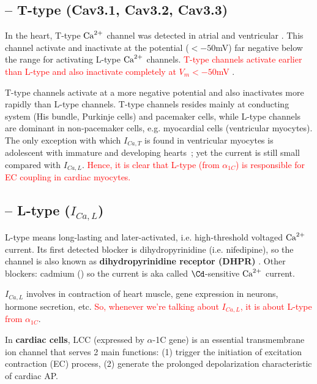 \subsection{-- T-type (Cav3.1, Cav3.2, Cav3.3)}
\label{sec:T-type_Ca-channels}

In the heart, T-type ${\text{Ca}^{2+}}$ channel was detected in atrial \citep{bean1985} and
ventricular \citep{nilius1985}. This channel activate and inactivate at the potential
($<-50$mV) far negative below the range for activating L-type ${\text{Ca}^{2+}}$ channels. 
\textcolor{red}{T-type channels activate earlier than L-type and also
inactivate completely at $V_m < -50$mV} \citep{hess1984}. 

\begin{framed}
  T-type channels activate at a more negative potential and also
  inactivates more rapidly than L-type channels. T-type channels resides
  mainly at conducting system (His bundle, Purkinje cells) and pacemaker
  cells, while L-type channels are dominant in non-pacemaker cells, e.g.
  myocardial cells (ventricular myocytes). The only exception with which
  $I_{Ca,T}$ is found in ventricular myocytes is adolescent with
  immature and developing hearts~\citep{chen2007afh}; yet the current is
  still small compared with $I_{Ca,L}$.
  \textcolor{red}{Hence, it is clear that L-type (from $\alpha_{1C}$) is
    responsible for EC coupling in cardiac myocytes.}
\end{framed}

\subsection{-- L-type ($I_{Ca,L}$)}
\label{sec:L-type_Ca-channels}

L-type means long-lasting and later-activated, i.e. high-threshold voltaged
${\text{Ca}^{2+}}$ current. Its first detected blocker is dihydropyrinidine (i.e.
nifedipine), so the channel is also known as {\bf dihydropyrinidine receptor
(DHPR)} \citep{reuter1985}. Other blockers: cadmium () so the current
is aka called $\Cd$-sensitive ${\text{Ca}^{2+}}$ current.

$I_{Ca,L}$ involves in contraction of heart muscle, gene expression in
neurons, hormone secretion, etc.
\textcolor{red}{So, whenever we're talking about $I_{Ca,L}$, it is
  about L-type from $\alpha_{1C}$}.


In {\bf cardiac cells}, LCC (expressed by $\alpha$-1C gene) is an essential
transmembrane ion channel that serves 2 main functions: (1) trigger the
initiation of excitation contraction (EC) process, (2) generate the prolonged
depolarization characteristic of cardiac AP.

